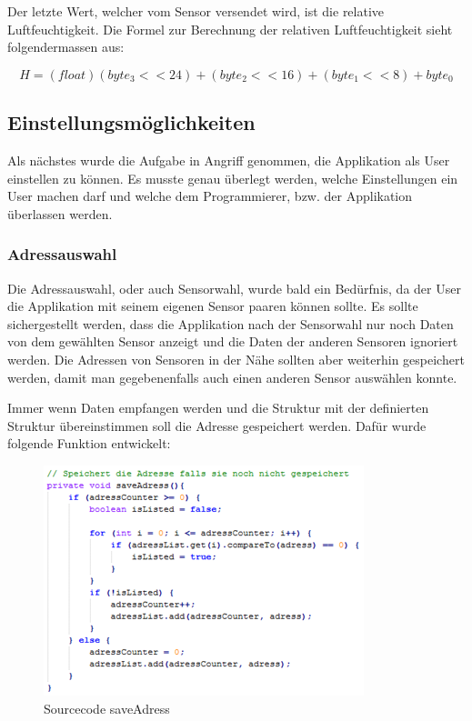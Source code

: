 Der letzte Wert, welcher vom Sensor versendet wird, ist die relative Luftfeuchtigkeit. Die Formel zur Berechnung der relativen Luftfeuchtigkeit sieht folgendermassen aus:

\begin{equation}
	H = (float)(byte_3 << 24) + (byte_2 << 16) + (byte_1 << 8) + byte_0
\end{equation}


\subsection{Einstellungsmöglichkeiten}

Als nächstes wurde die Aufgabe in Angriff genommen, die Applikation als User einstellen zu können. Es musste genau überlegt werden, welche Einstellungen ein User machen darf und welche dem Programmierer, bzw. der Applikation überlassen werden.

\subsubsection{Adressauswahl}

Die Adressauswahl, oder auch Sensorwahl, wurde bald ein Bedürfnis, da der User die Applikation mit seinem eigenen Sensor paaren können sollte. Es sollte sichergestellt werden, dass die Applikation nach der Sensorwahl nur noch Daten von dem gewählten Sensor anzeigt und die Daten der anderen Sensoren ignoriert werden. Die Adressen von Sensoren in der Nähe sollten aber weiterhin gespeichert werden, damit man gegebenenfalls auch einen anderen Sensor auswählen konnte.

Immer wenn Daten empfangen werden und die Struktur mit der definierten Struktur übereinstimmen soll die Adresse gespeichert werden. Dafür wurde folgende Funktion entwickelt:

\begin{figure}[ht]
    \includegraphics{3Vorgehen/imag/app_saveAdress.png}
    \caption{Sourcecode saveAdress}
	\label{app_saveAdress} 
\end{figure}

